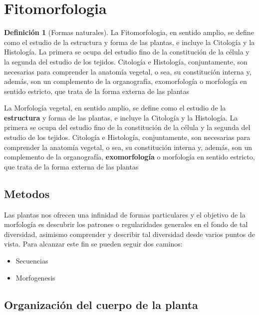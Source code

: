\documentclass[16pt,]{krantz}
\theoremstyle{definition}
\newtheorem{definition}{Definición}[chapter]
\theoremstyle{definition}
\theoremstyle{definition}
\theoremstyle{definition}
\theoremstyle{remark}
\begin{document}
\hypertarget{fitomorfologia}{%
\section{Fitomorfologia}\label{fitomorfologia}}

\begin{definition}[Formas naturales]
\protect\hypertarget{def:ww3}{}{\label{def:ww3} {} }La Fitomorfologia, en sentido amplio, se define como el estudio de la estructura y forma de las plantas, e incluye la Citología y la Histología. La primera se ocupa del estudio fino de la constitución de la célula y la segunda del estudio de los tejidos. Citología e Histología, conjuntamente, son necesarias para comprender la anatomía vegetal, o sea, su constitución interna y, además, son un complemento de la organografía, exomorfología o morfología en sentido estricto, que trata de la forma externa de las plantas
\end{definition}
La Morfología vegetal, en sentido amplio, se define como el estudio de la \textbf{estructura} y forma de las plantas, e incluye la Citología y la Histología. La primera se ocupa del estudio fino de la constitución de la célula y la segunda del estudio de los tejidos. Citología e Histología, conjuntamente, son necesarias para comprender la anatomía vegetal, o sea, su constitución interna y, además, son un complemento de la organografía, \textbf{exomorfología} o morfología en sentido estricto, que trata de la forma externa de las plantas

\hypertarget{metodos}{%
\subsection{Metodos}\label{metodos}}

Las plantas nos ofrecen una infinidad de formas particulares y el objetivo de la morfología es descubrir los patrones o regularidades generales en el fondo de tal diversidad, asimismo comprender y describir tal diversidad desde varios puntos de vista. Para alcanzar este fin se pueden seguir dos caminos:

\begin{itemize}
\item
  Secuencias
\item
  Morfogenesis
\end{itemize}

\hypertarget{organizaciuxf3n-del-cuerpo-de-la-planta}{%
\subsection{Organización del cuerpo de la planta}\label{organizaciuxf3n-del-cuerpo-de-la-planta}}
\end{document}
